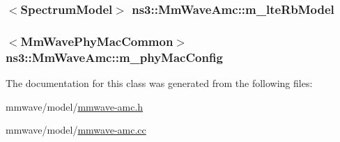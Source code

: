 \subsubsection[{\texorpdfstring{m\+\_\+lte\+Rb\+Model}{m_lteRbModel}}]{$<${\bf Spectrum\+Model}$>$ ns3\+::\+Mm\+Wave\+Amc\+::m\+\_\+lte\+Rb\+Model\hspace{0.3cm}{\ttfamily [private]}}\hypertarget{classns3_1_1MmWaveAmc_a4c27746a8b0aac6c3915bdd2e2326bac}{}\label{classns3_1_1MmWaveAmc_a4c27746a8b0aac6c3915bdd2e2326bac}
\subsubsection[{\texorpdfstring{m\+\_\+phy\+Mac\+Config}{m_phyMacConfig}}]{$<${\bf Mm\+Wave\+Phy\+Mac\+Common}$>$ ns3\+::\+Mm\+Wave\+Amc\+::m\+\_\+phy\+Mac\+Config\hspace{0.3cm}{\ttfamily [private]}}\hypertarget{classns3_1_1MmWaveAmc_ae2bd45429e23c9091597462d888e8d6f}{}\label{classns3_1_1MmWaveAmc_ae2bd45429e23c9091597462d888e8d6f}


The documentation for this class was generated from the following files\+:\begin{DoxyCompactItemize}
\item 
mmwave/model/\hyperlink{mmwave-amc_8h}{mmwave-\/amc.\+h}\item 
mmwave/model/\hyperlink{mmwave-amc_8cc}{mmwave-\/amc.\+cc}\end{DoxyCompactItemize}
